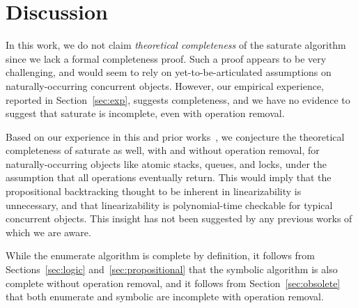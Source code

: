 \section{Discussion}
\label{sec:discussion}

In this work, we do not claim \emph{theoretical completeness} of the {\sc
saturate} algorithm since we lack a formal completeness proof. Such a proof
appears to be very challenging, and would seem to rely on yet-to-be-articulated
assumptions on naturally-occurring concurrent objects. However, our empirical
experience, reported in Section~\ref{sec:exp}, suggests completeness, and we
have no evidence to suggest that {\sc saturate} is incomplete, even with
operation removal.

Based on our experience in this and prior works~\cite{ conf/esop/BouajjaniEEH13,
conf/popl/BouajjaniEEH15}, we conjecture the theoretical completeness of {\sc
saturate} as well, with and without operation removal, for naturally-occurring
objects like atomic stacks, queues, and locks, under the assumption that all
operations eventually return. This would imply that the propositional
backtracking thought to be inherent in linearizability is unnecessary, and that
linearizability is polynomial-time checkable for typical concurrent objects.
This insight has not been suggested by any previous works of which we are aware.

While the {\sc enumerate} algorithm is complete by definition, it follows from
Sections~\ref{sec:logic} and~\ref{sec:propositional} that the {\sc symbolic}
algorithm is also complete without operation removal, and it follows from
Section~\ref{sec:obsolete} that both {\sc enumerate} and {\sc symbolic} are
incomplete with operation removal.
